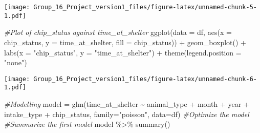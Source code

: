 \documentclass[
]{article}
\newenvironment{Shaded}{\begin{snugshade}}{\end{snugshade}}
\newcommand{\AttributeTok}[1]{\textcolor[rgb]{0.77,0.63,0.00}{#1}}
\newcommand{\CommentTok}[1]{\textcolor[rgb]{0.56,0.35,0.01}{\textit{#1}}}
\newcommand{\FunctionTok}[1]{\textcolor[rgb]{0.00,0.00,0.00}{#1}}
\newcommand{\NormalTok}[1]{#1}
\newcommand{\OtherTok}[1]{\textcolor[rgb]{0.56,0.35,0.01}{#1}}
\newcommand{\SpecialCharTok}[1]{\textcolor[rgb]{0.00,0.00,0.00}{#1}}
\newcommand{\StringTok}[1]{\textcolor[rgb]{0.31,0.60,0.02}{#1}}
\begin{document}
\texttt{[image: Group\_16\_Project\_version1\_files/figure-latex/unnamed-chunk-5-1.pdf]}

\begin{Shaded}
\begin{Highlighting}[]
\CommentTok{\#Plot of chip\_status against time\_at\_shelter}
\FunctionTok{ggplot}\NormalTok{(}\AttributeTok{data =}\NormalTok{ df, }\FunctionTok{aes}\NormalTok{(}\AttributeTok{x =}\NormalTok{ chip\_status, }\AttributeTok{y =}\NormalTok{ time\_at\_shelter, }\AttributeTok{fill =}\NormalTok{ chip\_status)) }\SpecialCharTok{+}
  \FunctionTok{geom\_boxplot}\NormalTok{() }\SpecialCharTok{+}
  \FunctionTok{labs}\NormalTok{(}\AttributeTok{x =} \StringTok{"chip\_status"}\NormalTok{, }\AttributeTok{y =} \StringTok{"time\_at\_shelter"}\NormalTok{) }\SpecialCharTok{+}
  \FunctionTok{theme}\NormalTok{(}\AttributeTok{legend.position =} \StringTok{"none"}\NormalTok{)}
\end{Highlighting}
\end{Shaded}

\texttt{[image: Group\_16\_Project\_version1\_files/figure-latex/unnamed-chunk-6-1.pdf]}

\begin{Shaded}
\begin{Highlighting}[]
\CommentTok{\#Modelling}
\NormalTok{model }\OtherTok{=} \FunctionTok{glm}\NormalTok{(time\_at\_shelter }\SpecialCharTok{\textasciitilde{}}\NormalTok{ animal\_type }\SpecialCharTok{+}\NormalTok{ month }\SpecialCharTok{+}\NormalTok{ year }\SpecialCharTok{+}\NormalTok{ intake\_type }\SpecialCharTok{+}\NormalTok{ chip\_status, }\AttributeTok{family=}\StringTok{"poisson"}\NormalTok{, }\AttributeTok{data=}\NormalTok{df)}
\CommentTok{\#Optimize the model}
\CommentTok{\#Summarize the first model}
\NormalTok{model }\SpecialCharTok{\%\textgreater{}\%}
  \FunctionTok{summary}\NormalTok{()}
\end{Highlighting}
\end{Shaded}
\end{document}
